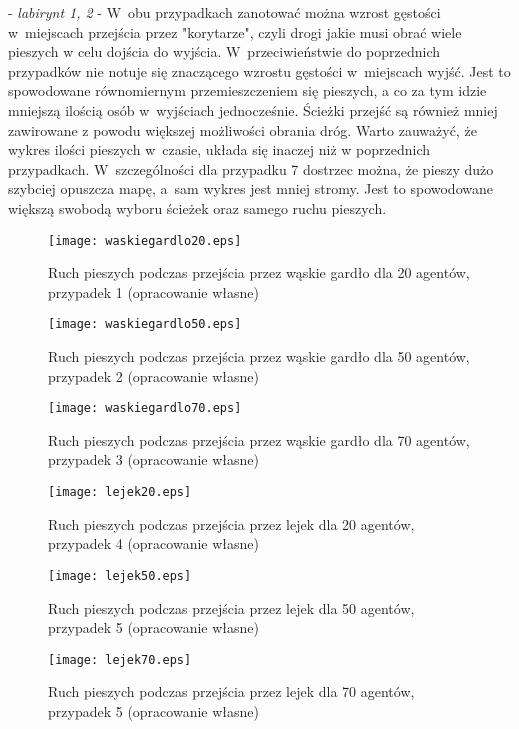 - \textit{labirynt 1, 2} - W~obu przypadkach zanotować można wzrost gęstości w~miejscach przejścia przez "korytarze", czyli drogi jakie musi obrać wiele pieszych w celu dojścia do wyjścia. W~przeciwieństwie do poprzednich przypadków nie notuje się znaczącego wzrostu gęstości w~miejscach wyjść. Jest to spowodowane równomiernym przemieszczeniem się pieszych, a co za tym idzie mniejszą ilością osób w~wyjściach jednocześnie. Ścieżki przejść są również mniej zawirowane z powodu większej możliwości obrania dróg. Warto zauważyć, że wykres ilości pieszych w~czasie, układa się inaczej niż w poprzednich przypadkach. W~szczególności dla przypadku 7 dostrzec można, że pieszy dużo szybciej opuszcza mapę, a~sam wykres jest mniej stromy. Jest to spowodowane większą swobodą wyboru ścieżek oraz samego ruchu pieszych.

\begin{figure}
\label{figure:siatka}
\centering
\texttt{[image: waskiegardlo20.eps]}
\caption{Ruch pieszych podczas przejścia przez wąskie gardło dla 20 agentów, przypadek 1 (opracowanie własne)}
\end{figure}

\begin{figure}
\label{figure:siatka}
\centering
\texttt{[image: waskiegardlo50.eps]}
\caption{Ruch pieszych podczas przejścia przez wąskie gardło dla 50 agentów, przypadek 2 (opracowanie własne)}
\end{figure}

\begin{figure}
\label{figure:siatka}
\centering
\texttt{[image: waskiegardlo70.eps]}
\caption{Ruch pieszych podczas przejścia przez wąskie gardło dla 70 agentów, przypadek 3 (opracowanie własne)}
\end{figure}

\begin{figure}
\label{figure:siatka}
\centering
\texttt{[image: lejek20.eps]}
\caption{Ruch pieszych podczas przejścia przez lejek dla 20 agentów, przypadek 4 (opracowanie własne)}
\end{figure}

\begin{figure}
\label{figure:siatka}
\centering
\texttt{[image: lejek50.eps]}
\caption{Ruch pieszych podczas przejścia przez lejek dla 50 agentów, przypadek 5 (opracowanie własne)}
\end{figure}

\begin{figure}
\label{figure:siatka}
\centering
\texttt{[image: lejek70.eps]}
\caption{Ruch pieszych podczas przejścia przez lejek dla 70 agentów, przypadek 5 (opracowanie własne)}
\end{figure}

